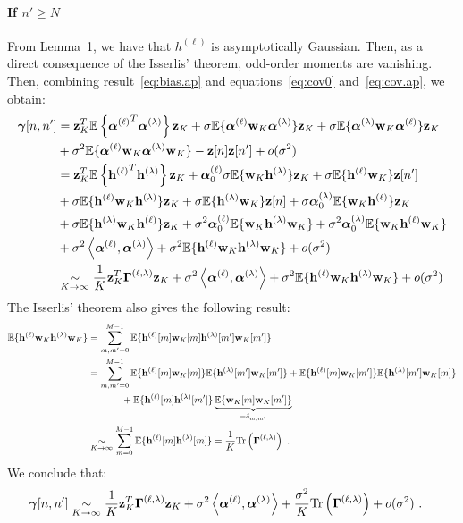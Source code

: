 \documentclass[journal, onecolumn]{IEEEtran}
\begin{document}
\paragraph{If $n'\geq N$}
From Lemma~1, we have that $h^{(\ell)}$ is asymptotically Gaussian. Then, as a direct consequence of the Isserlis' theorem, odd-order moments are vanishing. Then, combining result~\eqref{eq:bias.ap} and equations~\eqref{eq:cov0} and~\eqref{eq:cov.ap}, we obtain:
\begin{align*}  
\boldsymbol{\gamma}[n,n'] &= {\mathbf z}_K^T{\mathbb E}\left\{{\boldsymbol{\alpha}^{(\ell)}}^T\boldsymbol{\alpha}^{(\lambda)}\right\}{\mathbf z}_K + \sigma{\mathbb E}\{\boldsymbol{\alpha}^{(\ell)}{\mathbf w}_K\boldsymbol{\alpha}^{(\lambda)}\}{\mathbf z}_K+ \sigma{\mathbb E}\{\boldsymbol{\alpha}^{(\lambda)}{\mathbf w}_K\boldsymbol{\alpha}^{(\ell)}\}{\mathbf z}_K \\
& +\sigma^2{\mathbb E}\{\boldsymbol{\alpha}^{(\ell)}{\mathbf w}_K\boldsymbol{\alpha}^{(\lambda)}{\mathbf w}_K\}-{\mathbf z}[n]{\mathbf z}[n']+o(\sigma^2) \\
&= {\mathbf z}_K^T{\mathbb E}\left\{{{\mathbf h}^{(\ell)}}^T{\mathbf h}^{(\lambda)}\right\}{\mathbf z}_K + \boldsymbol{\alpha}_0^{(\ell)}\sigma{\mathbb E}\{{\mathbf w}_K{\mathbf h}^{(\lambda)}\}{\mathbf z}_K + \sigma{\mathbb E}\{{\mathbf h}^{(\ell)}{\mathbf w}_K\}{\mathbf z}[n']  \\
&+ \sigma{\mathbb E}\{{\mathbf h}^{(\ell)}{\mathbf w}_K{\mathbf h}^{(\lambda)}\}{\mathbf z}_K+ \sigma{\mathbb E}\{{\mathbf h}^{(\lambda)}{\mathbf w}_K\}{\mathbf z}[n] + \sigma\boldsymbol{\alpha}_0^{(\lambda)}{\mathbb E}\{{\mathbf w}_K{\mathbf h}^{(\ell)}\}{\mathbf z}_K \\
& + \sigma{\mathbb E}\{{\mathbf h}^{(\lambda)}{\mathbf w}_K{\mathbf h}^{(\ell)}\}{\mathbf z}_K+\sigma^2\boldsymbol{\alpha}_0^{(\ell)}{\mathbb E}\{{\mathbf w}_K{\mathbf h}^{(\lambda)}{\mathbf w}_K\}+\sigma^2\boldsymbol{\alpha}_0^{(\lambda)}{\mathbb E}\{{\mathbf w}_K{\mathbf h}^{(\ell)}{\mathbf w}_K\} \\
&+\sigma^2\left\langle\boldsymbol{\alpha}^{(\ell)},\boldsymbol{\alpha}^{(\lambda)}\right\rangle +\sigma^2{\mathbb E}\{{\mathbf h}^{(\ell)}{\mathbf w}_K{\mathbf h}^{(\lambda)}{\mathbf w}_K\} + o(\sigma^2) \\
&\underset{K\to\infty}{\sim} \dfrac1K{\mathbf z}_K^T\boldsymbol{\Gamma}^{(\ell,\lambda)}{\mathbf z}_K +\sigma^2\left\langle\boldsymbol{\alpha}^{(\ell)},\boldsymbol{\alpha}^{(\lambda)}\right\rangle +\sigma^2{\mathbb E}\{{\mathbf h}^{(\ell)}{\mathbf w}_K{\mathbf h}^{(\lambda)}{\mathbf w}_K\} + o(\sigma^2)
\end{align*}
The Isserlis' theorem also gives the following result:
\begin{align*}
{\mathbb E}\{{\mathbf h}^{(\ell)}{\mathbf w}_K{\mathbf h}^{(\lambda)}{\mathbf w}_K\} &= \sum_{m,m'=0}^{M-1}{\mathbb E}\{{\mathbf h}^{(\ell)}[m]{\mathbf w}_K[m]{\mathbf h}^{(\lambda)}[m']{\mathbf w}_K[m']\} \\
&= \sum_{m,m'=0}^{M-1}{\mathbb E}\{{\mathbf h}^{(\ell)}[m]{\mathbf w}_K[m]\}{\mathbb E}\{{\mathbf h}^{(\lambda)}[m']{\mathbf w}_K[m']\} + {\mathbb E}\{{\mathbf h}^{(\ell)}[m]{\mathbf w}_K[m']\}{\mathbb E}\{{\mathbf h}^{(\lambda)}[m']{\mathbf w}_K[m]\} \\
&\hspace{35pt} + {\mathbb E}\{{\mathbf h}^{(\ell)}[m]{\mathbf h}^{(\lambda)}[m']\}\underbrace{{\mathbb E}\{{\mathbf w}_K[m]{\mathbf w}_K[m']\}}_{=\delta_{m,m'}} \\
&\underset{K\to\infty}{\sim} \sum_{m=0}^{M-1} {\mathbb E}\{{\mathbf h}^{(\ell)}[m]{\mathbf h}^{(\lambda)}[m]\} = \dfrac1K{\mathrm{Tr}}\left(\boldsymbol{\Gamma}^{(\ell,\lambda)}\right)\ .
\end{align*}
We conclude that:
\begin{align*}  
\boldsymbol{\gamma}[n,n'] &\underset{K\to\infty}{\sim} \dfrac1K{\mathbf z}_K^T\boldsymbol{\Gamma}^{(\ell,\lambda)}{\mathbf z}_K +\sigma^2\left\langle\boldsymbol{\alpha}^{(\ell)},\boldsymbol{\alpha}^{(\lambda)}\right\rangle +\dfrac{\sigma^2}{K}{\mathrm{Tr}}\left(\boldsymbol{\Gamma}^{(\ell,\lambda)}\right) + o(\sigma^2)\ .
\end{align*}
\end{document}
